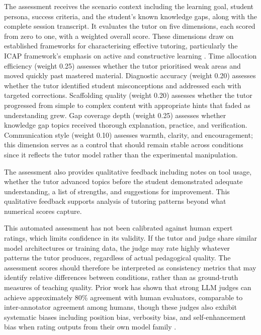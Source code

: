 \documentclass[logo,bsc,singlespacing,parskip,online]{infthesis}
\begin{document}
The assessment receives the scenario context including the learning goal, student persona, success criteria, and the student's known knowledge gaps, along with the complete session transcript. It evaluates the tutor on five dimensions, each scored from zero to one, with a weighted overall score. These dimensions draw on established frameworks for characterising effective tutoring, particularly the ICAP framework's emphasis on active and constructive learning \citep{chi2014icap}. Time allocation efficiency (weight 0.25) assesses whether the tutor prioritised weak areas and moved quickly past mastered material. Diagnostic accuracy (weight 0.20) assesses whether the tutor identified student misconceptions and addressed each with targeted corrections. Scaffolding quality (weight 0.20) assesses whether the tutor progressed from simple to complex content with appropriate hints that faded as understanding grew. Gap coverage depth (weight 0.25) assesses whether knowledge gap topics received thorough explanation, practice, and verification. Communication style (weight 0.10) assesses warmth, clarity, and encouragement; this dimension serves as a control that should remain stable across conditions since it reflects the tutor model rather than the experimental manipulation.

The assessment also provides qualitative feedback including notes on tool usage, whether the tutor advanced topics before the student demonstrated adequate understanding, a list of strengths, and suggestions for improvement. This qualitative feedback supports analysis of tutoring patterns beyond what numerical scores capture.

This automated assessment has not been calibrated against human expert ratings, which limits confidence in its validity. If the tutor and judge share similar model architectures or training data, the judge may rate highly whatever patterns the tutor produces, regardless of actual pedagogical quality. The assessment scores should therefore be interpreted as consistency metrics that may identify relative differences between conditions, rather than as ground-truth measures of teaching quality. Prior work has shown that strong LLM judges can achieve approximately 80\% agreement with human evaluators, comparable to inter-annotator agreement among humans, though these judges also exhibit systematic biases including position bias, verbosity bias, and self-enhancement bias when rating outputs from their own model family \citep{zheng2023judging, chen2024judgementbias}.
\end{document}

